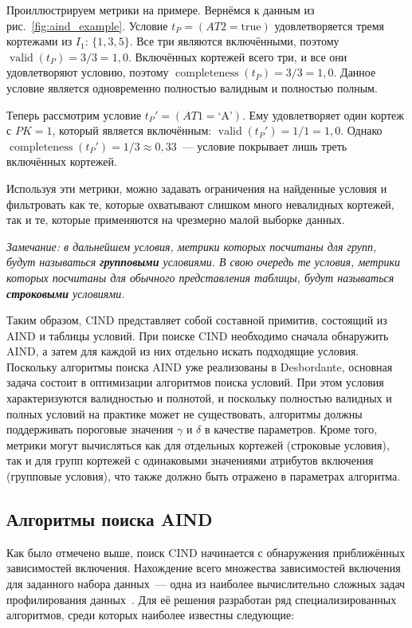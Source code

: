 Проиллюстрируем метрики на примере. Вернёмся к данным из рис.~\ref{fig:aind_example}. Условие $t_P = (\mathit{AT2} = \text{true})$ удовлетворяется тремя кортежами из $I_1$: $\{1, 3, 5\}$. Все три являются включёнными, поэтому $\operatorname{valid}(t_P) = 3/3 = 1{,}0$. Включённых кортежей всего три, и все они удовлетворяют условию, поэтому $\operatorname{completeness}(t_P) = 3/3 = 1{,}0$. Данное условие является одновременно полностью валидным и полностью полным.

Теперь рассмотрим условие $t_P' = (\mathit{AT1} = \text{`A'})$. Ему удовлетворяет один кортеж с $\mathit{PK} = 1$, который является включённым: $\operatorname{valid}(t_P') = 1/1 = 1{,}0$. Однако $\operatorname{completeness}(t_P') = 1/3 \approx 0{,}33$~--- условие покрывает лишь треть включённых кортежей.

Используя эти метрики, можно задавать ограничения на найденные условия и фильтровать как те, которые охватывают слишком много невалидных кортежей, так и те, которые применяются на чрезмерно малой выборке данных.

\emph{Замечание: в дальнейшем условия, метрики которых посчитаны для групп, будут называться \textbf{групповыми} условиями. В свою очередь те условия, метрики которых посчитаны для обычного представления таблицы, будут называться \textbf{строковыми} условиями.}

Таким образом, CIND представляет собой составной примитив, состоящий из AIND и таблицы условий. При поиске CIND необходимо сначала обнаружить AIND, а затем для каждой из них отдельно искать подходящие условия. Поскольку алгоритмы поиска AIND уже реализованы в Desbordante, основная задача состоит в оптимизации алгоритмов поиска условий. При этом условия характеризуются валидностью и полнотой, и поскольку полностью валидных и полных условий на практике может не существовать, алгоритмы должны поддерживать пороговые значения $\gamma$ и $\delta$ в качестве параметров. Кроме того, метрики могут вычисляться как для отдельных кортежей (строковые условия), так и для групп кортежей с одинаковыми значениями атрибутов включения (групповые условия), что также должно быть отражено в параметрах алгоритма.

\subsection{Алгоритмы поиска AIND}

Как было отмечено выше, поиск CIND начинается с обнаружения приближённых зависимостей включения. Нахождение всего множества зависимостей включения для заданного набора данных~--- одна из наиболее вычислительно сложных задач профилирования данных~\cite{dursch2019inclusion}. Для её решения разработан ряд специализированных алгоритмов, среди которых наиболее известны следующие:

